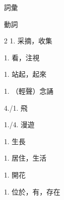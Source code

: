 \documentclass[aspectratio=169]{beamer}
\begin{document}
\begin{frame}{詞彙}
    \begin{block}{動詞}
        \begin{VocabCols}{2}
             1.  采摘，收集
            
             1.  看，注視
            
             1.  站起，起來
            
             1.  （輕聲）念誦
            
             4./1.  飛
            
             1./4.  漫遊
            
             1.  生長
            
             1.  居住，生活
            
             1.  開花
            
             1.  位於，有，存在
        \end{VocabCols}
    \end{block}
\end{frame}
\end{document}
